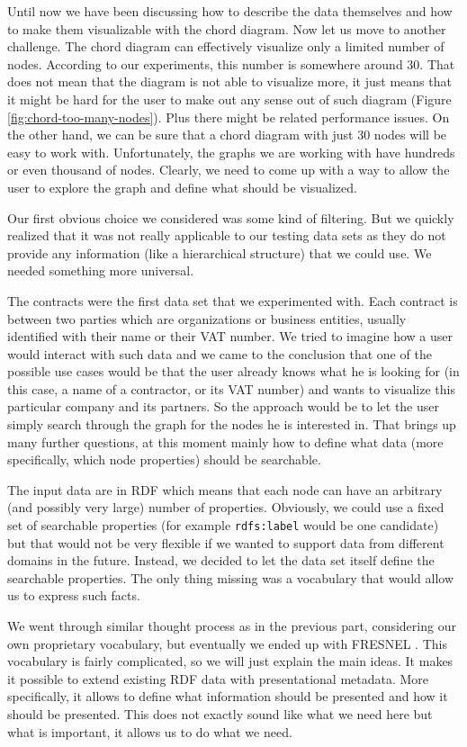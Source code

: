 Until now we have been discussing how to describe the data themselves and how to make them visualizable with the chord diagram. Now let us move to another challenge. The chord diagram can effectively visualize only a limited number of nodes. According to our experiments, this number is somewhere around 30. That does not mean that the diagram is not able to visualize more, it just means that it might be hard for the user to make out any sense out of such diagram (Figure \ref{fig:chord-too-many-nodes}). Plus there might be related performance issues. On the other hand, we can be sure that a chord diagram with just 30 nodes will be easy to work with. Unfortunately, the graphs we are working with have hundreds or even thousand of nodes. Clearly, we need to come up with a way to allow the user to explore the graph and define what should be visualized.

Our first obvious choice we considered was some kind of filtering. But we quickly realized that it was not really applicable to our testing data sets as they do not provide any information (like a hierarchical structure) that we could use. We needed something more universal.

The contracts were the first data set that we experimented with. Each contract is between two parties which are organizations or business entities, usually identified with their name or their VAT number. We tried to imagine how a user would interact with such data and we came to the conclusion that one of the possible use cases would be that the user already knows what he is looking for (in this case, a name of a contractor, or its VAT number) and wants to visualize this particular company and its partners. So the approach would be to let the user simply search through the graph for the nodes he is interested in. That brings up many further questions, at this moment mainly how to define what data (more specifically, which node properties) should be searchable.

The input data are in RDF which means that each node can have an arbitrary (and possibly very large) number of properties. Obviously, we could use a fixed set of searchable properties (for example \texttt{rdfs:label} would be one candidate) but that would not be very flexible if we wanted to support data from different domains in the future. Instead, we decided to let the data set itself define the searchable properties. The only thing missing was a vocabulary that would allow us to express such facts.

We went through similar thought process as in the previous part, considering our own proprietary vocabulary, but eventually we ended up with FRESNEL \cite{fresnel}. This vocabulary is fairly complicated, so we will just explain the main ideas. It makes it possible to extend existing RDF data with presentational metadata. More specifically, it allows to define what information should be presented and how it should be presented. This does not exactly sound like what we need here but what is important, it allows us to do what we need.

